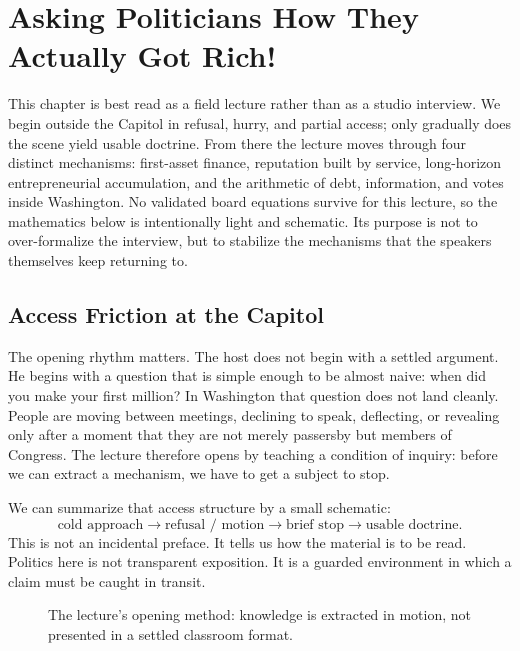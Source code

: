 \chapter{Asking Politicians How They Actually Got Rich!}

This chapter is best read as a field lecture rather than as a studio interview. We begin outside the Capitol in refusal, hurry, and partial access; only gradually does the scene yield usable doctrine. From there the lecture moves through four distinct mechanisms: first-asset finance, reputation built by service, long-horizon entrepreneurial accumulation, and the arithmetic of debt, information, and votes inside Washington. No validated board equations survive for this lecture, so the mathematics below is intentionally light and schematic. Its purpose is not to over-formalize the interview, but to stabilize the mechanisms that the speakers themselves keep returning to.

\section{Access Friction at the Capitol}

The opening rhythm matters. The host does not begin with a settled argument. He begins with a question that is simple enough to be almost naive: when did you make your first million? In Washington that question does not land cleanly. People are moving between meetings, declining to speak, deflecting, or revealing only after a moment that they are not merely passersby but members of Congress. The lecture therefore opens by teaching a condition of inquiry: before we can extract a mechanism, we have to get a subject to stop.

We can summarize that access structure by a small schematic:
\begin{equation}
\text{cold approach}\to \text{refusal / motion}\to \text{brief stop}\to \text{usable doctrine}.
\end{equation}
This is not an incidental preface. It tells us how the material is to be read. Politics here is not transparent exposition. It is a guarded environment in which a claim must be caught in transit.

\begin{figure}[h]
\centering
{}
\caption{The lecture's opening method: knowledge is extracted in motion, not presented in a settled classroom format.}
\end{figure}

